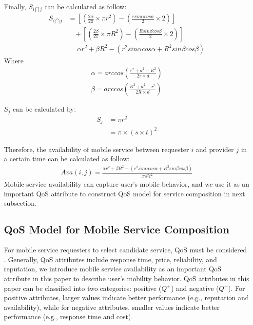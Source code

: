 \documentclass[10pt,journal,compsoc]{IEEEtran}
\begin{document}
Finally, $S_{i \bigcap j}$ can be calculated as follow:
\setlength{\arraycolsep}{0.0em}
\begin{align}
S_{i \bigcap j} & =  [(\frac{2\alpha}{2\pi} \times \pi r^2)-(\frac{r sin\alpha cos\alpha}{2} \times 2)]\\\nonumber
& \ \ \ \ +[(\frac{2\beta}{2\pi} \times \pi R^2)-(\frac{R sin\beta cos\beta}{2} \times 2)]\\\nonumber
& = \alpha r^2 + \beta R^2 - (r^2 sin\alpha cos\alpha + R^2 sin\beta cos\beta)
\end{align}
\setlength{\arraycolsep}{5pt}
Where
\begin{eqnarray}
\alpha = arccos(\frac{r^2+d^2-R^2}{2r\times d}) \\\nonumber
\beta = arccos(\frac{R^2+d^2-r^2}{2R\times d})
\end{eqnarray}

$S_j$ can be calculated by:
\begin{align}
S_j & = \pi r^2 \\\nonumber
& = \pi \times (s \times t)^2
\end{align}

Therefore, the availability of mobile service between requester $i$ and provider $j$ in a certain time can be calculated as follow:
\begin{align}
Ava(i,j) = \frac{\alpha r^2 + \beta R^2 - (r^2 sin\alpha cos\alpha + R^2 sin\beta cos\beta)}{\pi s^2 t^2}
\end{align}
Mobile service availability can capture user's mobile behavior, and we use it as an important QoS attribute to construct QoS model for service composition in next subsection.

\subsection{QoS Model for Mobile Service Composition}
For mobile service requesters to select candidate service, QoS must be considered \cite{Wu2016,luo2014efficient,luo2016generating}. Generally, QoS attributes include response time, price, reliability, and reputation, we introduce mobile service availability as an important QoS attribute in this paper to describe user's mobility behavior. QoS attributes in this paper can be classified into two categories: positive ($Q^+$) and negative ($Q^{-}$). For positive attributes, larger values indicate better performance (e.g., reputation and availability), while for negative attributes, smaller values indicate better performance (e.g., response time and cost).
\end{document}
